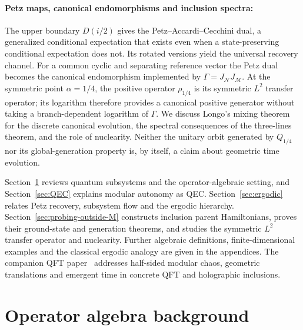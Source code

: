 \documentclass[a4paper,11pt]{article}
\theoremstyle{definition}
\newcommand{\mN}{\mathcal{N}}
\newcommand{\mM}{\mathcal{M}}
\begin{document}
\paragraph{Petz maps, canonical endomorphisms and inclusion spectra:}
The upper boundary $D(i/2)$ gives the Petz--Accardi--Cecchini dual, a generalized conditional expectation that exists even when a state-preserving conditional expectation does not. Its rotated versions yield the universal recovery channel. For a common cyclic and separating reference vector the Petz dual becomes the canonical endomorphism implemented by $\Gamma=J_{\mN}J_{\mM}$. At the symmetric point $\alpha=1/4$, the positive operator $\rho_{1/4}$ is its symmetric $L^2$ transfer operator; its logarithm therefore provides a canonical positive generator without taking a branch-dependent logarithm of $\Gamma$. We discuss Longo's mixing theorem for the discrete canonical evolution, the spectral consequences of the three-lines theorem, and the role of nuclearity. Neither the unitary orbit generated by $Q_{1/4}$ nor its global-generation property is, by itself, a claim about geometric time evolution.

Section~\ref{section:basics} reviews quantum subsystems and the operator-algebraic setting, and Section~\ref{sec:QEC} explains modular autonomy as QEC. Section~\ref{sec:ergodic} relates Petz recovery, subsystem flow and the ergodic hierarchy. Section~\ref{sec:probing-outside-M} constructs inclusion parent Hamiltonians, proves their ground-state and generation theorems, and studies the symmetric $L^2$ transfer operator and nuclearity. Further algebraic definitions, finite-dimensional examples and the classical ergodic analogy are given in the appendices. The companion QFT paper~\cite{companionQFT} addresses half-sided modular chaos, geometric translations and emergent time in concrete QFT and holographic inclusions.

\section{Operator algebra background}\label{section:basics}
\end{document}
